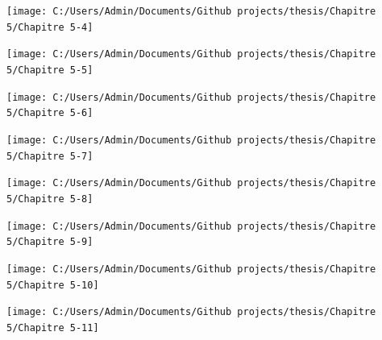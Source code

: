 \documentclass[
  english,
  man]{apa6}
\begin{document}
\begin{center}\texttt{[image: C:/Users/Admin/Documents/Github projects/thesis/Chapitre 5/Chapitre 5-4]} \end{center}

\begin{center}\texttt{[image: C:/Users/Admin/Documents/Github projects/thesis/Chapitre 5/Chapitre 5-5]} \end{center}

\begin{center}\texttt{[image: C:/Users/Admin/Documents/Github projects/thesis/Chapitre 5/Chapitre 5-6]} \end{center}

\begin{center}\texttt{[image: C:/Users/Admin/Documents/Github projects/thesis/Chapitre 5/Chapitre 5-7]} \end{center}

\begin{center}\texttt{[image: C:/Users/Admin/Documents/Github projects/thesis/Chapitre 5/Chapitre 5-8]} \end{center}

\begin{center}\texttt{[image: C:/Users/Admin/Documents/Github projects/thesis/Chapitre 5/Chapitre 5-9]} \end{center}

\begin{center}\texttt{[image: C:/Users/Admin/Documents/Github projects/thesis/Chapitre 5/Chapitre 5-10]} \end{center}

\begin{center}\texttt{[image: C:/Users/Admin/Documents/Github projects/thesis/Chapitre 5/Chapitre 5-11]} \end{center}
\end{document}
